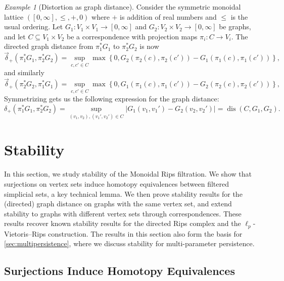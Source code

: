 \documentclass[a4paper,11pt]{article}
\newcounter{dummy}\numberwithin{dummy}{section}
\theoremstyle{remark}
\newtheorem{example}[dummy]{Example}
\begin{document}
\begin{example}[Distortion as graph distance]\label{ex:correspondence_distortion}
Consider the symmetric monoidal lattice $([0,\infty], \leq, +, 0)$ where $+$ is addition of real numbers and $\leq$ is the usual ordering. Let $G_1\colon V_1\times V_1\to [0,\infty]$ and $G_2\colon V_2\times V_2\to [0,\infty]$ be graphs, and let $C\subseteq V_1\times V_2$ be a correspondence with projection maps $\pi_i\colon C\to V_i$. The directed graph distance from $\pi_1^*G_1$ to $\pi_2^*G_2$ is now
\begin{equation*}
\vec{\delta}_+(\pi_1^*G_1,\pi_2^*G_2)=\sup_{c,c'\in C}\max\left\{0,G_2(\pi_2(c),\pi_2(c'))-G_1(\pi_1(c),\pi_1(c'))\right\},
\end{equation*}
and similarly 
\begin{equation*}
\vec{\delta}_+(\pi_2^*G_2,\pi_1^*G_1)=\sup_{c,c'\in C}\max\left\{0,G_1(\pi_1(c),\pi_1(c'))-G_2(\pi_2(c),\pi_2(c'))\right\},
\end{equation*}
Symmetrizing gets us the following expression for the graph distance:
\begin{equation*}
\delta_+(\pi_1^*G_1,\pi_2^*G_2) = \sup_{(v_1,v_2),(v_1',v_2')\in C}\vert G_1(v_1,v_1')-G_2(v_2,v_2')\vert=\operatorname{dis}(C,G_1,G_2).
\end{equation*}
\end{example}

\section{Stability}\label{sec:stability}
In this section, we study stability of the Monoidal Rips filtration. We show that surjections on vertex sets induce homotopy equivalences between filtered simplicial sets, a key technical lemma. We then prove stability results for the (directed) graph distance on graphs with the same vertex set, and extend stability to graphs with different vertex sets through correspondences. These results recover known stability results for the directed Rips complex and the $\ell_p$-Vietoris–Rips construction. The results in this section also form the basis for \cref{sec:multipersistence}, where we discuss stability for multi-parameter persistence.

\subsection{Surjections Induce Homotopy Equivalences}\label{sec:surjections_induce_homotopy_equivalences}
\end{document}

